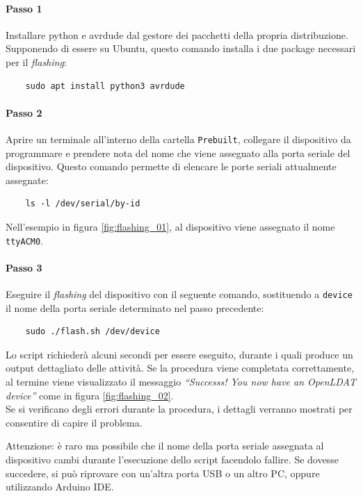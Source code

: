 \paragraph{Passo 1} Installare python e avrdude dal gestore dei pacchetti della propria distribuzione. Supponendo di essere su Ubuntu, questo comando installa i due package necessari per il \textit{flashing}:
\begin{verbatim}
	sudo apt install python3 avrdude
\end{verbatim}

\paragraph{Passo 2} Aprire un terminale all'interno della cartella \texttt{Prebuilt}, collegare il dispositivo da programmare e prendere nota del nome che viene assegnato alla porta seriale del dispositivo. Questo comando permette di elencare le porte seriali attualmente assegnate:
\begin{verbatim}
	ls -l /dev/serial/by-id
\end{verbatim}

Nell'esempio in figura \ref{fig:flashing_01}, al dispositivo viene assegnato il nome \texttt{ttyACM0}.

\paragraph{Passo 3} Eseguire il \textit{flashing} del dispositivo con il seguente comando, sostituendo a \texttt{device} il nome della porta seriale determinato nel passo precedente:
\begin{verbatim}
	sudo ./flash.sh /dev/device
\end{verbatim}

Lo script richiederà alcuni secondi per essere eseguito, durante i quali produce un output dettagliato delle attività. Se la procedura viene completata correttamente, al termine viene visualizzato il messaggio \textit{``Successs! You now have an OpenLDAT device''} come in figura \ref{fig:flashing_02}.\\
Se si verificano degli errori durante la procedura, i dettagli verranno mostrati per consentire di capire il problema.

Attenzione: è raro ma possibile che il nome della porta seriale assegnata al dispositivo cambi durante l'esecuzione dello script facendolo fallire. Se dovesse succedere, si può riprovare con un'altra porta USB o un altro PC, oppure utilizzando Arduino IDE.

